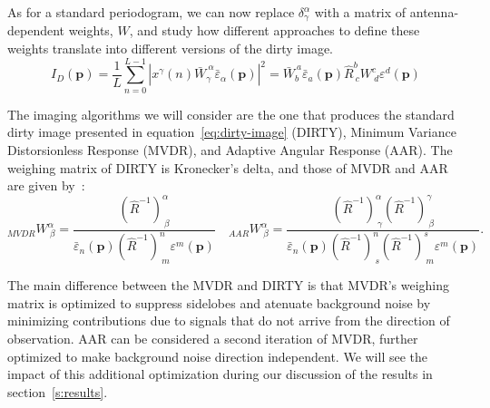 \documentclass[11pt]{article}
\begin{document}
As for a standard periodogram, we can now replace $\delta^{\alpha}_{\gamma}$ with a matrix of antenna-dependent weights, $W$, and study how different approaches to define these weights translate into different versions of the dirty image.
\begin{equation}
    \label{eq:intensity-general}
I_D \left(\mathbf{p}\right) =
    \frac{1}{L}
    \sum_{n = 0}^{L - 1}
    \left|
    x^{\gamma}(n)
    \bar{W}^{\ \alpha}_{\gamma}
    \bar{\varepsilon}_{\alpha} \left(\mathbf{p}\right)
    \right|^2 =
    \bar{W}^{\ a}_{b}
    \bar{\varepsilon}_{a} \left(\mathbf{p}\right)
    \hat{R}^{b}_{\ c}
    {W}^{c}_{\ d}
    {\varepsilon}^{d} \left(\mathbf{p}\right)
\end{equation}

The imaging algorithms we will consider are the one that produces the standard dirty image presented in equation~\ref{eq:dirty-image} (DIRTY), Minimum Variance Distorsionless Response (MVDR), and Adaptive Angular Response (AAR).
The weighing matrix of DIRTY is Kronecker's delta, and those of MVDR and AAR are given by~\parencite{bhattacharyya_signal_2013}:
\begin{equation}
    \label{eq:weighing-matrices}
    {}_{MVDR}W^{\alpha}_{\ \beta} =
        \frac{
            (\hat{R}^{-1})^{\alpha}_{\ \beta}
        }{
            \bar{\varepsilon}_n \left(\mathbf{p}\right)
            (\hat{R}^{-1})^{n}_{\ m}
            \varepsilon^m \left(\mathbf{p}\right)
        }
    \quad
    {}_{AAR}W^{\alpha}_{\ \beta} =
        \frac{
            (\hat{R}^{-1})^{\alpha}_{\ \gamma}
            (\hat{R}^{-1})^{\gamma}_{\ \beta}
        }{
            \bar{\varepsilon}_n \left(\mathbf{p}\right)
            (\hat{R}^{-1})^{n}_{\ s}
            (\hat{R}^{-1})^{s}_{\ m}
            \varepsilon^m \left(\mathbf{p}\right)
        }.
\end{equation}

The main difference between the MVDR and DIRTY is that MVDR's weighing matrix is optimized to suppress sidelobes and atenuate background noise by minimizing contributions due to signals that do not arrive from the direction of observation.
AAR can be considered a second iteration of MVDR, further optimized to make background noise direction independent.
We will see the impact of this additional optimization during our discussion of the results in section~\ref{s:results}.

\end{document}
